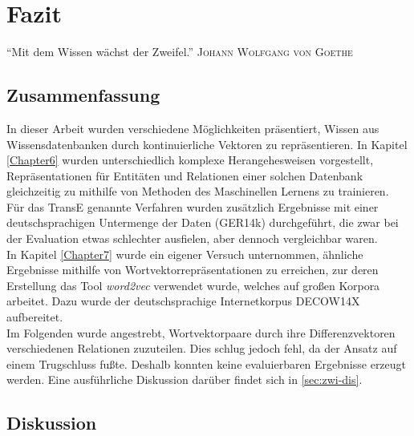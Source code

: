 
\chapter{Fazit} %

\label{Chapter9} %


\begin{itquote}
  ``Mit dem Wissen wächst der Zweifel.''
  \flushright
  \textsc{Johann Wolfgang von Goethe}
\end{itquote}

\section{Zusammenfassung}

In dieser Arbeit wurden verschiedene Möglichkeiten präsentiert, Wissen aus Wissensdatenbanken durch kontinuierliche Vektoren
zu repräsentieren. In Kapitel \ref{Chapter6} wurden unterschiedlich komplexe Herangehesweisen vorgestellt, Repräsentationen
für Entitäten und Relationen einer solchen Datenbank gleichzeitig zu mithilfe von Methoden des Maschinellen Lernens zu trainieren.\\
Für das TransE genannte Verfahren wurden zusätzlich Ergebnisse mit einer deutschsprachigen Untermenge der Daten (GER14k)
durchgeführt, die zwar bei der Evaluation etwas schlechter ausfielen, aber dennoch vergleichbar waren.\\

In Kapitel \ref{Chapter7} wurde ein eigener Versuch unternommen, ähnliche Ergebnisse mithilfe von Wortvektorrepräsentationen
zu erreichen, zur deren Erstellung das Tool \emph{word2vec} verwendet wurde, welches auf großen Korpora arbeitet. Dazu
wurde der deutschsprachige Internetkorpus DECOW14X aufbereitet.\\
Im Folgenden wurde angestrebt, Wortvektorpaare durch ihre Differenzvektoren verschiedenen Relationen zuzuteilen. Dies schlug
jedoch fehl, da der Ansatz auf einem Trugschluss fußte. Deshalb konnten keine evaluierbaren Ergebnisse erzeugt werden.
Eine ausführliche Diskussion darüber findet sich in \ref{sec:zwi-dis}.

\section{Diskussion}

